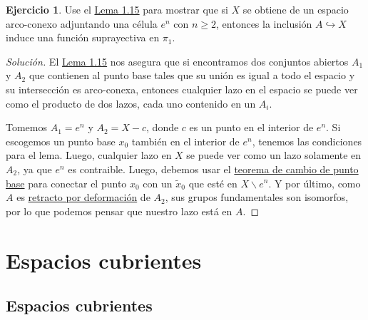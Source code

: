 \documentclass[spanish]{book}
\theoremstyle{definition}
\newtheorem*{ejer}{Ejercicio}
\begin{document}
\begin{ejer}
	Use el \hyperref[lema:homotopia]{Lema 1.15} para mostrar que si $X$ se obtiene de un espacio arco-conexo adjuntando una célula $e^n$ con $n\geq2$, entonces la inclusión $A\hookrightarrow X$ induce una función suprayectiva en $\pi_1$.
\end{ejer}
\begin{proof}[Solución]
	El \hyperref[lema:homotopia]{Lema 1.15} nos asegura que si encontramos dos conjuntos abiertos $A_1$ y $A_2$ que contienen al punto base tales que su unión es igual a todo el espacio y su intersección es arco-conexa, entonces cualquier lazo en el espacio se puede ver como el producto de dos lazos, cada uno contenido en un $A_i$.
	
	Tomemos $A_1=e^n$ y $A_2=X-c$, donde $c$ es un punto en el interior de $e^n$. Si escogemos un punto base $x_0$ también en el interior de $e^n$, tenemos las condiciones para el lema. Luego, cualquier lazo en $X$ se puede ver como un lazo solamente en $A_2$, ya que $e^n$ es contraible. Luego, debemos usar el \hyperref[teo:cambioptobase]{teorema de cambio de punto base} para conectar el punto $x_0$ con un $\tilde{x}_0$ que esté en $X\backslash e^n$. Y por último, como $A$ es \hyperref[def:retracto]{retracto por deformación} de $A_2$, sus grupos fundamentales son isomorfos, por lo que podemos pensar que nuestro lazo está en $A$.
\end{proof}
\part{Espacios cubrientes}
\chapter{Espacios cubrientes}
\end{document}
